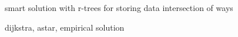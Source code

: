 \documentclass[14pt]{beamer}
\begin{document}
\begin{frame}
  smart solution with r-trees for storing data
  intersection of ways
\end{frame}

\begin{frame}
  dijkstra, astar, empirical solution
\end{frame}










\end{document}
